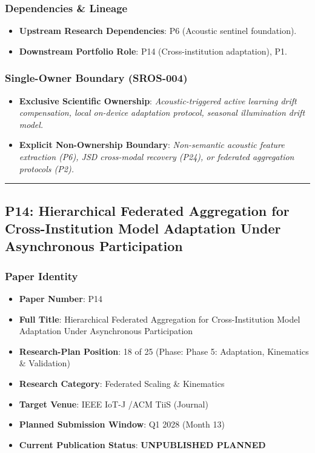 \documentclass[11pt,letterpaper]{article}
\begin{document}
\subsubsection{Dependencies \& Lineage}
\begin{itemize}[leftmargin=*]
    \item \textbf{Upstream Research Dependencies}: P6 (Acoustic sentinel foundation).
    \item \textbf{Downstream Portfolio Role}: P14 (Cross-\allowbreak institution adaptation), P1.
\end{itemize}

\subsubsection{Single-Owner Boundary (SROS-004)}
\begin{itemize}[leftmargin=*]
    \item \textbf{Exclusive Scientific Ownership}: \textit{Acoustic-\allowbreak triggered active learning drift compensation, local on-\allowbreak device adaptation protocol, seasonal illumination drift model.}
    \item \textbf{Explicit Non-Ownership Boundary}: \textit{Non-\allowbreak semantic acoustic feature extraction (P6), JSD cross-\allowbreak modal recovery (P24), or federated aggregation protocols (P2).}
\end{itemize}

\vspace{0.4cm}
\hrule

\subsection{P14: Hierarchical Federated Aggregation for Cross-\allowbreak Institution Model Adaptation Under Asynchronous Participation}
\label{sec:profile_p14}

\subsubsection{Paper Identity}
\begin{itemize}[leftmargin=*]
    \item \textbf{Paper Number}: P14
    \item \textbf{Full Title}: Hierarchical Federated Aggregation for Cross-\allowbreak Institution Model Adaptation Under Asynchronous Participation
    \item \textbf{Research-Plan Position}: 18 of 25 (Phase: Phase 5: Adaptation, Kinematics \& Validation)
    \item \textbf{Research Category}: Federated Scaling \& Kinematics
    \item \textbf{Target Venue}: IEEE IoT-\allowbreak J /\allowbreak  ACM TiiS (Journal)
    \item \textbf{Planned Submission Window}: Q1 2028 (Month 13)
    \item \textbf{Current Publication Status}: \textbf{UNPUBLISHED PLANNED}
\end{itemize}
\end{document}
